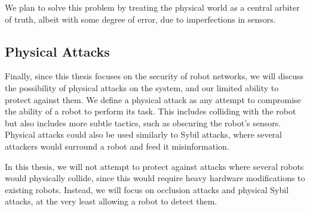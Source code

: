 We plan to solve this problem by treating the physical world as a central arbiter of truth, albeit with some degree of error, due to imperfections in sensors.

\subsection{Physical Attacks}
Finally, since this thesis focuses on the security of robot networks, we will discuss the possibility of physical attacks on the system, and our limited ability to protect against them. We define a physical attack as any attempt to compromise the ability of a robot to perform its task. This includes colliding with the robot but also includes more subtle tactics, such as obscuring the robot's sensors. Physical attacks could also be used similarly to Sybil attacks, where several attackers would surround a robot and feed it misinformation. 

In this thesis, we will not attempt to protect against attacks where several robots would physically collide, since this would require heavy hardware modifications to existing robots. Instead, we will focus on occlusion attacks and physical Sybil attacks, at the very least allowing a robot to detect them.\\